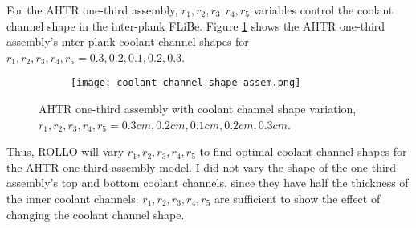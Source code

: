 For the \gls{AHTR} one-third assembly, $r_1, r_2, r_3, r_4, r_5$ variables control the
coolant channel shape in the inter-plank \gls{FLiBe}. 
Figure \ref{fig:coolant-channel-shape-assem} shows the \gls{AHTR} one-third assembly's 
inter-plank coolant channel shapes for $r_1, r_2, r_3, r_4, r_5 = 0.3, 0.2, 0.1, 0.2, 0.3$.
\begin{figure}[htbp]
    \centering
    \begin{subfigure}{.8\textwidth}
    \texttt{[image: coolant-channel-shape-assem.png]}
    \end{subfigure}%
    \begin{subfigure}{.2\textwidth}
        \vspace{1cm}
    \end{subfigure}
    \caption{\acrfull{AHTR} one-third assembly with coolant channel shape variation, 
    $r_1, r_2, r_3, r_4, r_5 = 0.3cm, 0.2cm, 0.1cm, 0.2cm, 0.3cm$.}
    \label{fig:coolant-channel-shape-assem}
\end{figure}
Thus, \gls{ROLLO} will vary $r_1, r_2, r_3, r_4, r_5$ to find optimal coolant 
channel shapes for the \gls{AHTR} one-third assembly model.
I did not vary the shape of the one-third assembly's top and bottom coolant channels, 
since they have half the thickness of the inner coolant channels.  
$r_1, r_2, r_3, r_4, r_5$ are sufficient to show the effect of changing the 
coolant channel shape.

